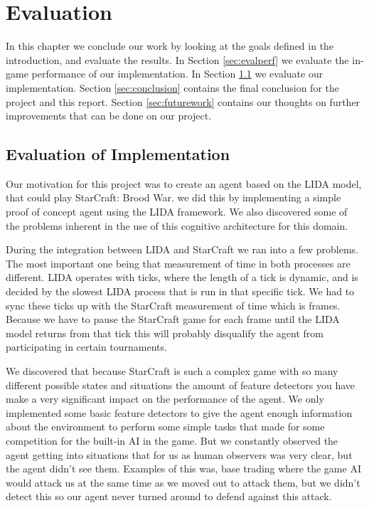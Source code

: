 
\chapter{Evaluation}
In this chapter we conclude our work by looking at the goals defined in the introduction, and evaluate the results.
In Section \ref{sec:evalperf} we evaluate the in-game performance of our implementation.
In Section \ref{sec:evalimp} we evaluate our implementation.
Section \ref{sec:conclusion} contains the final conclusion for the project and this report.
Section \ref{sec:futurework} contains our thoughts on further improvements that can be done on our project.

\section{Evaluation of Implementation}
\label{sec:evalimp}
Our motivation for this project was to create an agent based on the LIDA model, that could play StarCraft: Brood War. we did this by implementing a simple proof of concept agent using the LIDA framework. We also discovered some of the problems inherent in the use of this cognitive architecture for this domain.

During the integration between LIDA and StarCraft we ran into a few problems. The most important one being that measurement of time in both processes are different. LIDA operates with ticks, where the length of a tick is dynamic, and is decided by the slowest LIDA process that is run in that specific tick. We had to sync these ticks up with the StarCraft measurement  of time which is frames. Because we have to pause the StarCraft game for each frame until the LIDA model returns from that tick this will probably disqualify the agent from participating in certain tournaments.

We discovered that because StarCraft is such a complex game with so many different possible states and situations the amount of feature detectors you have make a very significant impact on the performance of the agent. We only implemented some basic feature detectors to give the agent enough information about the environment to perform some simple tasks that made for some competition for the built-in AI in the game. But we constantly observed the agent getting into situations that for us as human observers was very clear, but the agent didn't see them. Examples of this was, base trading where the game AI would attack us at the same time as we moved out to attack them, but we didn't detect this so our agent never turned around to defend against this attack.

